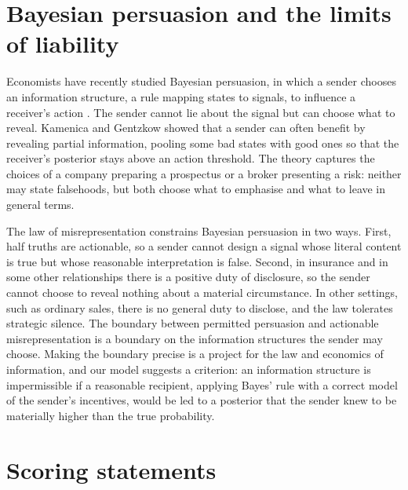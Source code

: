 \section{Bayesian persuasion and the limits of liability}

Economists have recently studied Bayesian persuasion, in which a sender chooses an information structure, a rule mapping states to signals, to influence a receiver's action \citep{kamenica2011}. The sender cannot lie about the signal but can choose what to reveal. Kamenica and Gentzkow showed that a sender can often benefit by revealing partial information, pooling some bad states with good ones so that the receiver's posterior stays above an action threshold. The theory captures the choices of a company preparing a prospectus or a broker presenting a risk: neither may state falsehoods, but both choose what to emphasise and what to leave in general terms.

The law of misrepresentation constrains Bayesian persuasion in two ways. First, half truths are actionable, so a sender cannot design a signal whose literal content is true but whose reasonable interpretation is false. Second, in insurance and in some other relationships there is a positive duty of disclosure, so the sender cannot choose to reveal nothing about a material circumstance. In other settings, such as ordinary sales, there is no general duty to disclose, and the law tolerates strategic silence. The boundary between permitted persuasion and actionable misrepresentation is a boundary on the information structures the sender may choose. Making the boundary precise is a project for the law and economics of information, and our model suggests a criterion: an information structure is impermissible if a reasonable recipient, applying Bayes' rule with a correct model of the sender's incentives, would be led to a posterior that the sender knew to be materially higher than the true probability.

\section{Scoring statements}

